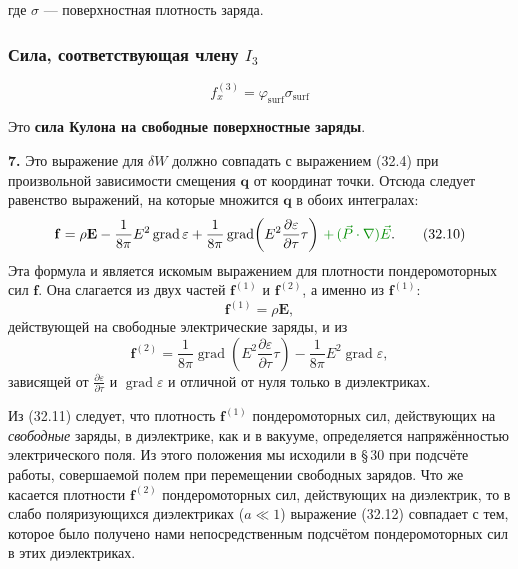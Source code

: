 \documentclass[a4paper,10pt]{article}
\newcommand{\modmath}[1]{\textcolor{modcolor}{#1}}
\begin{document}
{где $\sigma$ --- поверхностная плотность заряда.

\subsubsection{Сила, соответствующая члену $I_3$}

\begin{equation}
\boxed{
f_x^{(3)} = \varphi_{\text{surf}}\sigma_{\text{surf}}
}
\label{eq:force_term_3}
\end{equation}

Это \textbf{сила Кулона на свободные поверхностные заряды}.

}%




\textbf{7.} Это выражение для $\delta W$ должно совпадать с выражением
(32.4) при произвольной зависимости смещения $\mathbf{q}$ от координат
точки. Отсюда следует равенство выражений, на которые множится
$\mathbf{q}$ в обоих интегралах:
\begin{equation}
    \mathbf{f} = \rho\mathbf{E}
               - \frac{1}{8\pi}E^2\operatorname{grad}\varepsilon
               + \frac{1}{8\pi}\operatorname{grad}\!\left(
                   E^2\frac{\partial\varepsilon}{\partial\tau}\tau
                 \right)
               \,\modmath{ + \, (\vec{P}\cdot\nabla)\vec E}.
    \tag{32.10}
\end{equation}
Эта формула и является искомым выражением для плотности пондеромоторных
сил $\mathbf{f}$. Она слагается из двух частей $\mathbf{f}^{(1)}$
и $\mathbf{f}^{(2)}$, а именно из $\mathbf{f}^{(1)}$:
\begin{equation}
    \mathbf{f}^{(1)} = \rho\mathbf{E},
    \tag{32.11}
\end{equation}
действующей на свободные электрические заряды, и из
\begin{equation}
    \mathbf{f}^{(2)}
    = \frac{1}{8\pi}\operatorname{grad}\!\left(
        E^2\frac{\partial\varepsilon}{\partial\tau}\tau
      \right)
    - \frac{1}{8\pi}E^2\operatorname{grad}\varepsilon,
    \tag{32.12}
\end{equation}
зависящей от $\frac{\partial\varepsilon}{\partial\tau}$ и
$\operatorname{grad}\varepsilon$ и отличной от нуля только в диэлектриках.


Из (32.11) следует, что плотность $\mathbf{f}^{(1)}$ пондеромоторных
сил, действующих на \textit{свободные} заряды, в диэлектрике, как и
в вакууме, определяется напряжённостью электрического поля. Из этого
положения мы исходили в §\,30 при подсчёте работы, совершаемой полем
при перемещении свободных зарядов. Что же касается плотности
$\mathbf{f}^{(2)}$ пондеромоторных сил, действующих на диэлектрик, то
в слабо поляризующихся диэлектриках ($a \ll 1$) выражение (32.12)
совпадает с тем, которое было получено нами непосредственным подсчётом
пондеромоторных сил в этих диэлектриках.
\end{document}

